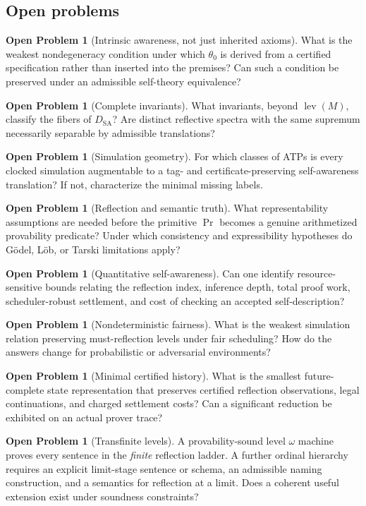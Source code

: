 \documentclass[11pt,letterpaper]{article}
\theoremstyle{definition}\newtheorem{definition}[theorem]{Definition}\newtheorem{example}[theorem]{Example}\newtheorem{protocol}[theorem]{Protocol}\newtheorem{question}[theorem]{Open Problem}
\theoremstyle{remark}\newtheorem{remark}[theorem]{Remark}
\newcommand{\lev}{\operatorname{lev}}
\newcommand{\Prov}{\operatorname{Pr}}
\begin{document}
\subsection{Open problems}
\begin{question}[Intrinsic awareness, not just inherited axioms]
What is the weakest nondegeneracy condition under which $\theta_0$ is derived from a certified specification rather than inserted into the premises? Can such a condition be preserved under an admissible self-theory equivalence?
\end{question}
\begin{question}[Complete invariants]
What invariants, beyond $\lev(M)$, classify the fibers of $D_{\mathrm{SA}}$? Are distinct reflective spectra with the same supremum necessarily separable by admissible translations?
\end{question}
\begin{question}[Simulation geometry]
For which classes of ATPs is every clocked simulation augmentable to a tag- and certificate-preserving self-awareness translation? If not, characterize the minimal missing labels.
\end{question}
\begin{question}[Reflection and semantic truth]
What representability assumptions are needed before the primitive $\Prov$ becomes a genuine arithmetized provability predicate? Under which consistency and expressibility hypotheses do G\"odel, L\"ob, or Tarski limitations apply?
\end{question}
\begin{question}[Quantitative self-awareness]
Can one identify resource-sensitive bounds relating the reflection index, inference depth, total proof work, scheduler-robust settlement, and cost of checking an accepted self-description?
\end{question}
\begin{question}[Nondeterministic fairness]
What is the weakest simulation relation preserving must-reflection levels under fair scheduling? How do the answers change for probabilistic or adversarial environments?
\end{question}
\begin{question}[Minimal certified history]
What is the smallest future-complete state representation that preserves certified reflection observations, legal continuations, and charged settlement costs? Can a significant reduction be exhibited on an actual prover trace?
\end{question}
\begin{question}[Transfinite levels]
A provability-sound level $\omega$ machine proves every sentence in the \emph{finite} reflection ladder. A further ordinal hierarchy requires an explicit limit-stage sentence or schema, an admissible naming construction, and a semantics for reflection at a limit. Does a coherent useful extension exist under soundness constraints?
\end{question}
\end{document}
